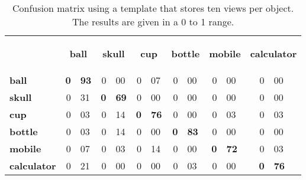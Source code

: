 
\begin{table}[H]
\centering
\begin{tabular} {l r@{.}l r@{.}l r@{.}l r@{.}l r@{.}l r@{.}l }
\toprule
\addlinespace[3mm]
   \multicolumn{1}{c}{\begin{center}\textbf{Real} \mid \textbf{Predicted}\end{center}} &
   \multicolumn{2}{c}{\begin{flushright}\textbf{ball}\end{flushright}} &
   \multicolumn{2}{c}{\begin{flushright}\textbf{skull}\end{flushright}} &
   \multicolumn{2}{c}{\begin{flushright}\textbf{cup}\end{flushright}} &
   \multicolumn{2}{c}{\begin{flushright}\textbf{bottle}\end{flushright}} &
   \multicolumn{2}{c}{\begin{flushright}\textbf{mobile}\end{flushright}} &
   \multicolumn{2}{c}{\begin{flushright}\textbf{calculator}\end{flushright}} &\\

\addlinespace[-3mm]

\midrule
\textbf{ball}		&	\textbf{0}&\textbf{93}	&	0&00	&	0&07	&	0&00	&	0&00	&	0&00	\\
\textbf{skull}		&	0&31	&	\textbf{0}&\textbf{69}	&	0&00	&	0&00	&	0&00	&	0&00	\\
\textbf{cup}		&	0&03	&	0&14	&	\textbf{0}&\textbf{76}	&	0&00	&	0&03	&	0&03	\\
\textbf{bottle}		&	0&03	&	0&14	&	0&00	&	\textbf{0}&\textbf{83}	&	0&00	&	0&00	\\
\textbf{mobile}		&	0&07	&	0&03	&	0&14	&	0&00	&	\textbf{0}&\textbf{72}	&	0&03	\\
\textbf{calculator}	&	0&21	&	0&00	&	0&00	&	0&03	&	0&00	&	\textbf{0}&\textbf{76}	\\


\bottomrule
\end{tabular}
\caption[Confusion matrix - templates using 10 views]{Confusion matrix using a template that stores ten views per object. The results are given in a 0 to 1 range. }
\label{10views_matrix}
\end{table}




